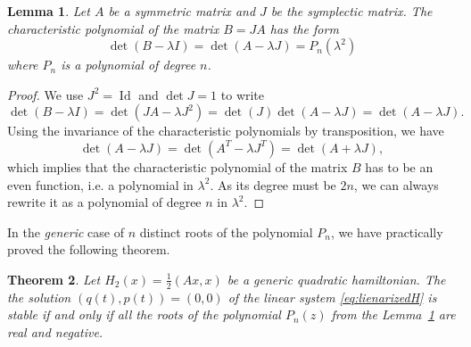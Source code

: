 \documentclass[english,fontsize=11pt,paper=a5,oneside]{scrbook}
\DeclareMathOperator{\Id}{Id}
\newtheorem{theorem}{Theorem}[chapter]
\newtheorem{lemma}[theorem]{Lemma}
\theoremstyle{definition}
\begin{document}
\begin{lemma}\label{eq:lemmaCP}
    Let $A$ be a symmetric matrix and $J$ be the symplectic matrix.
    The characteristic polynomial of the matrix $B=JA$ has the form
    \begin{equation}
        \det(B-\lambda I) = \det(A-\lambda J) = P_n(\lambda^2)
    \end{equation}
    where $P_n$ is a polynomial of degree $n$.
\end{lemma}
\begin{proof}
    We use $J^2 = \Id$ and $\det J= 1$ to write
    \begin{equation}
        \det(B-\lambda I) = \det(JA - \lambda J^2) = \det(J) \det(A-\lambda J) = \det(A-\lambda J).
    \end{equation}
    Using the invariance of the characteristic polynomials by transposition, we have
    \begin{equation}
        \det(A-\lambda J) = \det(A^T -\lambda J^T) = \det(A + \lambda J),
    \end{equation}
    which implies that the characteristic polynomial of the matrix $B$ has to be an even function, i.e. a polynomial in $\lambda^2$.
    As its degree must be $2n$, we can always rewrite it as a polynomial of degree $n$ in $\lambda^2$.
\end{proof}

In the \emph{generic} case of $n$ distinct roots of the polynomial $P_n$, we have practically proved the following theorem.

\begin{theorem}
    Let $H_2(x) = \frac12(Ax,x)$ be a generic quadratic hamiltonian. The the solution $(q(t), p(t)) = (0,0)$ of the linear system \eqref{eq:lienarizedH} is stable if and only if all the roots of the polynomial $P_n(z)$ from the Lemma~\ref{eq:lemmaCP} are real and negative.
\end{theorem}
\end{document}
